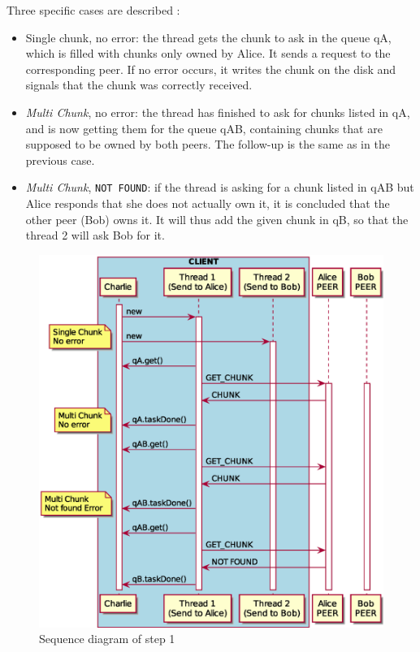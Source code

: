 Three specific cases are described : 

\begin{itemize}
	\item Single chunk, no error: the thread gets the chunk to ask in the queue qA, which is filled with chunks only owned by Alice. It sends a request to the corresponding peer. If no error occurs, it writes the chunk on the disk and signals that the chunk was correctly received.
	
	\item \textit{Multi Chunk}, no error: the thread has finished to ask for chunks listed in qA, and is now getting them for the queue qAB, containing chunks that are supposed to be owned by both peers. The follow-up is the same as in the previous case.
	
	\item \textit{Multi Chunk}, \texttt{NOT FOUND}: if the thread is asking for a chunk listed in qAB but Alice responds that she does not actually own it, it is concluded that the other peer (Bob) owns it. It will thus add the given chunk in qB, so that the thread 2 will ask Bob for it.
\end{itemize}

\begin{figure}
	\centering
	\includegraphics[width=\textwidth]{img/step1.eps}
	\caption{Sequence diagram of step 1}
	\label{fig:step1}
\end{figure}